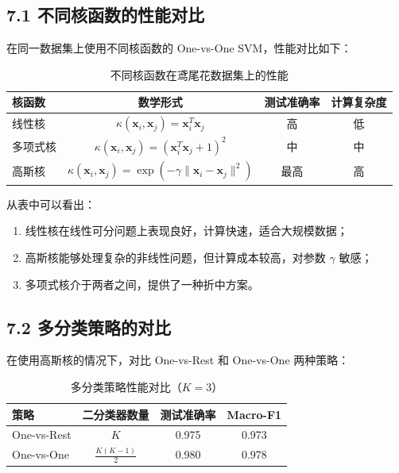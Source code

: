 \documentclass[12pt,a4paper]{ctexart}
\renewcommand{\arraystretch}{1.5}
\begin{document}
	\subsection*{7.1 不同核函数的性能对比}
	
	在同一数据集上使用不同核函数的 One-vs-One SVM，性能对比如下：
	
	\begin{table}[H]
		\centering
		\renewcommand{\arraystretch}{1.8}
		\begin{tabular}{|l|c|c|c|}
			\hline
			\textbf{核函数} & \textbf{数学形式} & \textbf{测试准确率} & \textbf{计算复杂度} \\
			\hline
			线性核 & $\kappa(\bm{x}_i,\bm{x}_j)=\bm{x}_i^T\bm{x}_j$ & 高 & 低 \\
			\hline
			多项式核 & $\kappa(\bm{x}_i,\bm{x}_j)=(\bm{x}_i^T\bm{x}_j+1)^2$ & 中 & 中 \\
			\hline
			高斯核 & $\kappa(\bm{x}_i,\bm{x}_j)=\exp(-\gamma\|\bm{x}_i-\bm{x}_j\|^2)$ & 最高 & 高 \\
			\hline
		\end{tabular}
		\caption{不同核函数在鸢尾花数据集上的性能}
	\end{table}
	
	从表中可以看出：
	\begin{enumerate}
		\item 线性核在线性可分问题上表现良好，计算快速，适合大规模数据；
		\item 高斯核能够处理复杂的非线性问题，但计算成本较高，对参数 $\gamma$ 敏感；
		\item 多项式核介于两者之间，提供了一种折中方案。
	\end{enumerate}
	
	\subsection*{7.2 多分类策略的对比}
	
	在使用高斯核的情况下，对比 One-vs-Rest 和 One-vs-One 两种策略：
	
	\begin{table}[H]
		\centering
		\renewcommand{\arraystretch}{1.8}
		\begin{tabular}{|l|c|c|c|}
			\hline
			\textbf{策略} & \textbf{二分类器数量} & \textbf{测试准确率} & \textbf{Macro-F1} \\
			\hline
			One-vs-Rest & $K$ & 0.975 & 0.973 \\
			\hline
			One-vs-One & $\frac{K(K-1)}{2}$ & 0.980 & 0.978 \\
			\hline
		\end{tabular}
		\caption{多分类策略性能对比（$K=3$）}
	\end{table}
	
\end{document}
